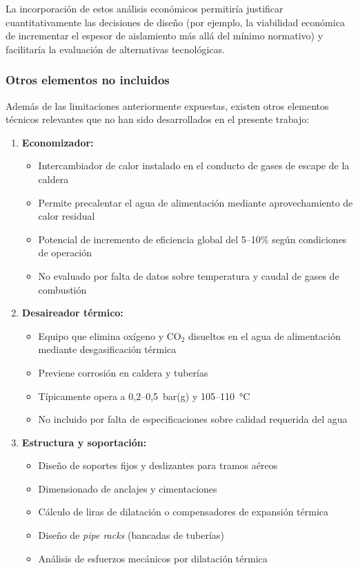 La incorporación de estos análisis económicos permitiría justificar cuantitativamente las decisiones de diseño (por ejemplo, la viabilidad económica de incrementar el espesor de aislamiento más allá del mínimo normativo) y facilitaría la evaluación de alternativas tecnológicas.

\subsubsection{Otros elementos no incluidos}
\label{subsubsec:limitaciones-otros-elementos}

Además de las limitaciones anteriormente expuestas, existen otros elementos técnicos relevantes que no han sido desarrollados en el presente trabajo:

\begin{enumerate}[label=\arabic*., leftmargin=2em]
	\item \textbf{Economizador:}
	      \begin{itemize}[noitemsep]
		      \item Intercambiador de calor instalado en el conducto de gases de escape de la caldera
		      \item Permite precalentar el agua de alimentación mediante aprovechamiento de calor residual
		      \item Potencial de incremento de eficiencia global del 5--10\% según condiciones de operación
		      \item No evaluado por falta de datos sobre temperatura y caudal de gases de combustión
	      \end{itemize}

	\item \textbf{Desaireador térmico:}
	      \begin{itemize}[noitemsep]
		      \item Equipo que elimina oxígeno y CO$_2$ disueltos en el agua de alimentación mediante desgasificación térmica
		      \item Previene corrosión en caldera y tuberías
		      \item Típicamente opera a 0,2--0,5~bar(g) y 105--110~°C
		      \item No incluido por falta de especificaciones sobre calidad requerida del agua
	      \end{itemize}

	\item \textbf{Estructura y soportación:}
	      \begin{itemize}[noitemsep]
		      \item Diseño de soportes fijos y deslizantes para tramos aéreos
		      \item Dimensionado de anclajes y cimentaciones
		      \item Cálculo de liras de dilatación o compensadores de expansión térmica
		      \item Diseño de \textit{pipe racks} (bancadas de tuberías)
		      \item Análisis de esfuerzos mecánicos por dilatación térmica
	      \end{itemize}


\end{enumerate}
